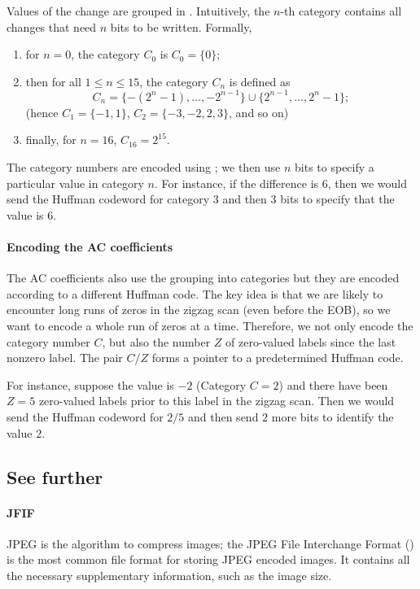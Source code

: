 \documentclass[a4paper, 11pt, openany]{book}
\begin{document}
Values of the change are grouped in . Intuitively, the $n$-th category contains all changes that need $n$ bits to be written. Formally,
\begin{enumerate}
    \item for $n=0$, the category $C_0$ is $C_0 = \{0\}$;

    \item  then for all $1 \le n \le 15$, the category $C_n$ is defined as
    \[
        C_n = \{ -(2^n - 1), \dots, -2^{n-1} \} \cup \{ 2^{n-1}, \dots, 2^n - 1 \};
    \]
    (hence $C_1 = \{-1,1\}$, $C_2 = \{-3, -2, 2, 3\}$, and so on)

    \item finally, for $n=16$, $C_{16} = 2^{15}$.
\end{enumerate}
The category numbers are encoded using ; we then use $n$ bits to specify a particular value in category $n$. For instance, if the difference is $6$, then we would send the Huffman codeword for category $3$ and then $3$ bits to specify that the value is $6$.


\paragraph{Encoding the AC coefficients}
The AC coefficients also use the grouping into categories but they are encoded according to a different Huffman code. The key idea is that we are likely to encounter long runs of zeros in the zigzag scan (even before the EOB), so we want to encode a whole run of zeros at a time. Therefore, we not only encode the category number $C$, but also the number $Z$ of zero-valued labels since the last nonzero label. The pair $C/Z$ forms a pointer to a predetermined Huffman code.

For instance, suppose the value is $-2$ (Category $C = 2$) and there have been $Z = 5$ zero-valued labels prior to this label in the zigzag scan. Then we would send the Huffman codeword for $2/5$ and then send $2$ more bits to identify the value $2$.







\subsection{See further}


\paragraph{JFIF} JPEG is the algorithm to compress images; the JPEG File Interchange Format () is the most common file format for storing JPEG encoded images. It contains all the necessary supplementary information, such as the image size.
\end{document}
